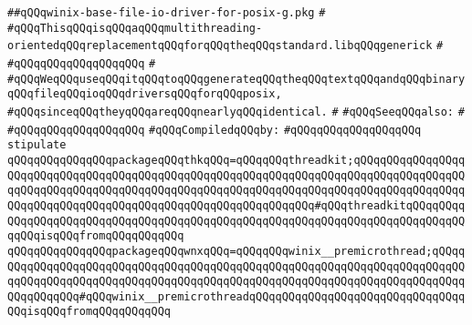 \label{src/lib/std/src/io/winix-base-file-io-driver-for-posix-g.pkg}
\verb|##qQQqwinix-base-file-io-driver-for-posix-g.pkg|\newline
\verb|#|\newline
\verb|#qQQqThisqQQqisqQQqaqQQqmultithreading-orientedqQQqreplacementqQQqforqQQqtheqQQqstandard.libqQQqgenerick|\newline
\verb|#|\newline
\verb|#qQQqqQQqqQQqqQQqqQQq|\newline
\verb|#|\newline
\verb|#qQQqWeqQQquseqQQqitqQQqtoqQQqgenerateqQQqtheqQQqtextqQQqandqQQqbinaryqQQqfileqQQqioqQQqdriversqQQqforqQQqposix,|\newline
\verb|#qQQqsinceqQQqtheyqQQqareqQQqnearlyqQQqidentical.|\newline
\verb|#|\newline
\verb|#qQQqSeeqQQqalso:|\newline
\verb|#|\newline
\verb|#qQQqqQQqqQQqqQQqqQQq|\newline
\newline
\verb|#qQQqCompiledqQQqby:|\newline
\verb|#qQQqqQQqqQQqqQQqqQQq|\newline
\newline
\newline
\newline
\verb|stipulate|\newline
\verb|qQQqqQQqqQQqqQQqpackageqQQqthkqQQq=qQQqqQQqthreadkit;qQQqqQQqqQQqqQQqqQQqqQQqqQQqqQQqqQQqqQQqqQQqqQQqqQQqqQQqqQQqqQQqqQQqqQQqqQQqqQQqqQQqqQQqqQQqqQQqqQQqqQQqqQQqqQQqqQQqqQQqqQQqqQQqqQQqqQQqqQQqqQQqqQQqqQQqqQQqqQQqqQQqqQQqqQQqqQQqqQQqqQQqqQQqqQQqqQQqqQQqqQQq#qQQqthreadkitqQQqqQQqqQQqqQQqqQQqqQQqqQQqqQQqqQQqqQQqqQQqqQQqqQQqqQQqqQQqqQQqqQQqqQQqqQQqqQQqqQQqisqQQqfromqQQqqQQqqQQq|\newline
\verb|qQQqqQQqqQQqqQQqpackageqQQqwnxqQQq=qQQqqQQqwinix__premicrothread;qQQqqQQqqQQqqQQqqQQqqQQqqQQqqQQqqQQqqQQqqQQqqQQqqQQqqQQqqQQqqQQqqQQqqQQqqQQqqQQqqQQqqQQqqQQqqQQqqQQqqQQqqQQqqQQqqQQqqQQqqQQqqQQqqQQqqQQqqQQqqQQqqQQqqQQqqQQq#qQQqwinix__premicrothreadqQQqqQQqqQQqqQQqqQQqqQQqqQQqqQQqqQQqisqQQqfromqQQqqQQqqQQq|\newline
